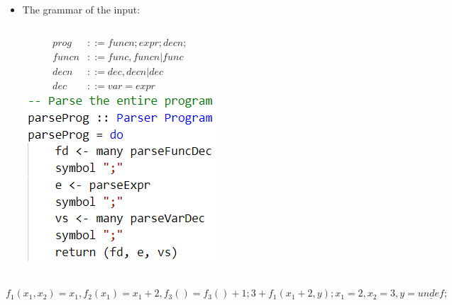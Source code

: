 \documentclass{beamer}
\begin{document}
\begin{frame}
	\begin{itemize}
		\item The grammar of the input:\\
		\begin{columns}
			\begin{align*}
			prog &::= funcn; expr; decn;\\
			funcn &::= func, funcn | func\\
			decn &::= dec, decn | dec\\
			dec &::= var = expr
			\end{align*}
			\includegraphics[scale=0.8]{img/code7}
		\end{columns}
	\end{itemize}

\begin{example}
	$f_1(x_1, x_2) = x_1, f_2(x_1) = x_1 + 2, f_3() = f_3() + 1; 3 + f_1(x_1 + 2, y); x_1 = 2, x_2 = 3, y = \underline{undef};$
\end{example}
\end{frame}
\end{document}
